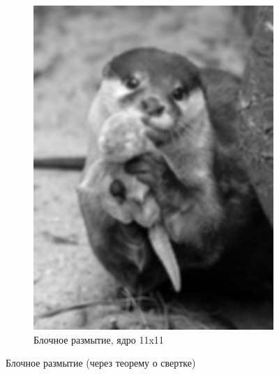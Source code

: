 \begin{figure}[ht!]
\begin{subfigure}[b]{0.5\linewidth}
        \includegraphics[width=0.95\linewidth]{block_11.png}
        \caption{Блочное размытие, ядро 11x11}
    \end{subfigure}
    \caption{Блочное размытие (через теорему о свертке)}
    \label{img:block2}
\end{figure}

